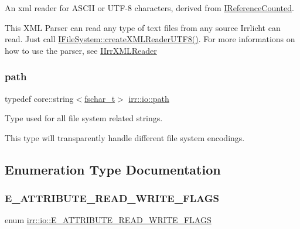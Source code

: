 An xml reader for A\+S\+C\+II or U\+T\+F-\/8 characters, derived from \hyperlink{classirr_1_1IReferenceCounted}{I\+Reference\+Counted}. 

This X\+ML Parser can read any type of text files from any source Irrlicht can read. Just call \hyperlink{classirr_1_1io_1_1IFileSystem_affd8f622ac7c3dcd507f20f9cd23b21f}{I\+File\+System\+::create\+X\+M\+L\+Reader\+U\+T\+F8()}. For more informations on how to use the parser, see \hyperlink{classirr_1_1io_1_1IIrrXMLReader}{I\+Irr\+X\+M\+L\+Reader} \mbox{\label{namespaceirr_1_1io_ab1bdc45edb3f94d8319c02bc0f840ee1}} 
\subsubsection{\texorpdfstring{path}{path}}
{\footnotesize\ttfamily typedef core\+::string$<$\hyperlink{namespaceirr_a813cca9bac9fa0c1427d89720a451460}{fschar\+\_\+t}$>$ \hyperlink{namespaceirr_1_1io_ab1bdc45edb3f94d8319c02bc0f840ee1}{irr\+::io\+::path}}



Type used for all file system related strings. 

This type will transparently handle different file system encodings. 

\subsection{Enumeration Type Documentation}
\mbox{\label{namespaceirr_1_1io_a84923cf86af38e49c6ec5ee36903d782}} 
\subsubsection{\texorpdfstring{E\+\_\+\+A\+T\+T\+R\+I\+B\+U\+T\+E\+\_\+\+R\+E\+A\+D\+\_\+\+W\+R\+I\+T\+E\+\_\+\+F\+L\+A\+GS}{E\_ATTRIBUTE\_READ\_WRITE\_FLAGS}}
{\footnotesize\ttfamily enum \hyperlink{namespaceirr_1_1io_a84923cf86af38e49c6ec5ee36903d782}{irr\+::io\+::\+E\+\_\+\+A\+T\+T\+R\+I\+B\+U\+T\+E\+\_\+\+R\+E\+A\+D\+\_\+\+W\+R\+I\+T\+E\+\_\+\+F\+L\+A\+GS}}



